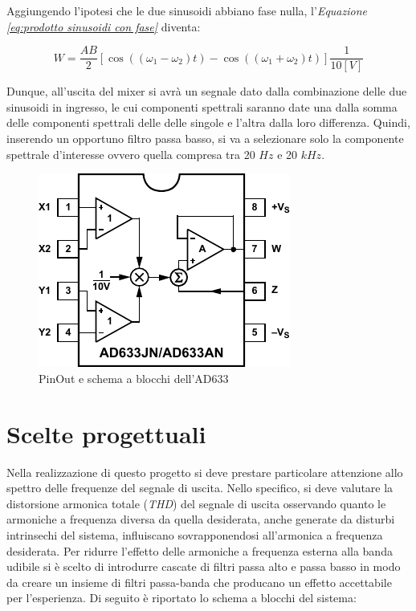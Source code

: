 \documentclass[titlepage]{report}
\begin{document}
	Aggiungendo l'ipotesi che le due sinusoidi abbiano fase nulla, l'\textit{Equazione \ref{eq:prodotto sinusoidi con fase}} diventa:


	\begin{equation}
		\label{eq:prodotto sinusoidi}
		W = \frac{AB}{2}[\cos ((\omega _1 - \omega _2)t) - \cos ((\omega _1 +\omega _2)t)]\frac{1}{10[V]} 
	\end{equation}
	

	Dunque, all'uscita del mixer si avrà un segnale dato dalla combinazione delle due sinusoidi in ingresso, le cui componenti spettrali saranno date una dalla somma delle componenti spettrali delle delle singole e l'altra dalla loro differenza.
	Quindi, inserendo un opportuno filtro passa basso, si va a selezionare solo la componente spettrale d'interesse ovvero quella compresa tra 20 $Hz$ e 20 $kHz$.

	
	\begin{figure}[H]
		\centering
		\includegraphics{Immagini/ad633_pinout.pdf}
		\caption{PinOut e schema a blocchi dell'AD633}
		\label{fig: AD633 schema a blocchi}
	\end{figure}


\chapter{Scelte progettuali}
	\label{ch:scelte}
	
	Nella realizzazione di questo progetto si deve prestare particolare attenzione allo spettro delle frequenze del segnale di uscita. Nello specifico, si deve valutare la distorsione armonica totale (\textit{THD}) del segnale di uscita osservando quanto le armoniche a frequenza diversa da quella desiderata, anche generate da disturbi intrinsechi del sistema, influiscano sovrapponendosi all'armonica a frequenza desiderata.
	Per ridurre l'effetto delle armoniche a frequenza esterna alla banda udibile si è scelto di introdurre cascate di filtri passa alto e passa basso in modo da creare un insieme di filtri passa-banda che producano un effetto accettabile per l'esperienza. Di seguito è riportato lo schema a blocchi del sistema:
\end{document}
